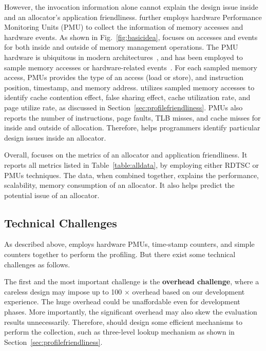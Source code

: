 However, the invocation information alone cannot  explain the design issue inside and an allocator's application friendliness. \MP{} further employs hardware Performance Monitoring Units (PMU) to collect the information of memory accesses and hardware events. As shown in Fig.~\ref{fig:basicidea}, \MP{} focuses on accesses and events for both inside and outside of memory management operations. The PMU hardware is ubiquitous in modern architectures~\cite{AMDIBS:07, IntelArch:PEBS:Sept09, armpmu}, and has been  employed to sample memory accesses or hardware-related events~\cite{DBLP:conf/sc/ItzkowitzWAK03, ibs-sc, ibs-pact, Sheng:2011:RLN:1985793.1985848, LASER, Cheetah}.
For each sampled memory access, PMUs provides the type of an access (load or store), and instruction position, timestamp, and memory address. \MP{} utilizes sampled memory accesses to identify cache contention effect, false sharing effect, cache utilization rate, and page utilize rate, as discussed in Section~\ref{sec:profilefriendliness}. PMUs also reports the number of instructions, page faults, TLB misses, and cache misses for inside and outside of allocation. Therefore, \MP{} helps programmers identify particular design issues inside an allocator. 


Overall, \MP{} focuses on the metrics of an  allocator and application friendliness. It  reports all metrics listed in Table~\ref{table:alldata}, by employing either RDTSC or PMUs techniques. The data, when combined together, explains the performance, scalability, memory consumption of an allocator. It also helps predict the potential issue of an allocator. 

\subsection{Technical Challenges}

As described above, \MP{} employs hardware PMUs, time-stamp counters, and simple counters together to perform the profiling. But there exist some technical challenges as follows. 

The first and the most important challenge is the \textbf{overhead challenge}, where a careless design may impose up to 100 $\times$ overhead based on our development experience. The huge overhead could be unaffordable even for development phases. More importantly, the significant overhead may also skew the evaluation results unnecessarily. Therefore, \MP{} should design some efficient mechanisms to perform the collection, such as three-level lookup mechanism as shown in Section~\ref{sec:profilefriendliness}. 

